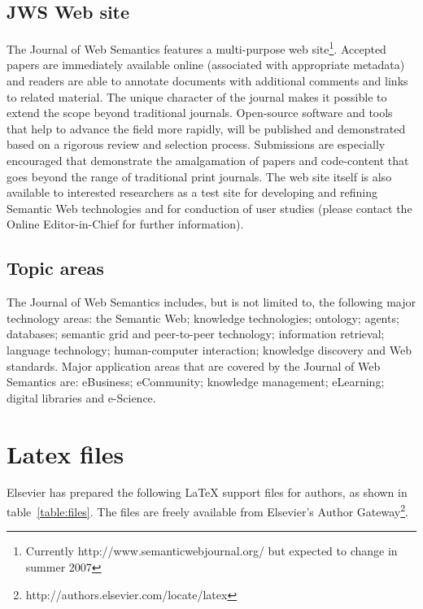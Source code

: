 \documentclass{elsart3p}    %
\begin{document}
\subsection{JWS Web site}

The Journal of Web Semantics features a multi-purpose web
site\footnote{Currently http://www.semanticwebjournal.org/ but
expected to change in summer 2007}. Accepted papers are
immediately available online (associated with appropriate
metadata) and readers are able to annotate documents with
additional comments and links to related material. The unique
character of the journal makes it possible to extend the scope
beyond traditional journals. Open-source software and tools that
help to advance the field more rapidly, will be published and
demonstrated based on a rigorous review and selection
process. Submissions are especially encouraged that demonstrate
the amalgamation of papers and code-content that goes beyond the
range of traditional print journals.  The web site itself is also
available to interested researchers as a test site for developing
and refining Semantic Web technologies and for conduction of user
studies (please contact the Online Editor-in-Chief for further
information).

\subsection{Topic areas}

The Journal of Web Semantics includes, but is not limited to, the
following major technology areas: the Semantic Web; knowledge
technologies; ontology; agents; databases; semantic grid and
peer-to-peer technology; information retrieval; language
technology; human-computer interaction; knowledge discovery and
Web standards.  Major application areas that are covered by the
Journal of Web Semantics are: eBusiness; eCommunity; knowledge
management; eLearning; digital libraries and e-Science.

\section{Latex files}

Elsevier has prepared the following \LaTeX{} support files
for authors, as shown in table~\ref{table:files}.  The files
are freely available from Elsevier's Author
Gateway\footnote{http://authors.elsevier.com/locate/latex}.
\end{document}
